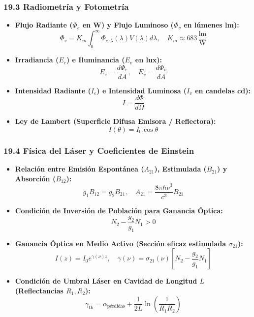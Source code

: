 \documentclass[11pt,a4paper]{article}
\begin{document}
\subsubsection*{19.3 Radiometría y Fotometría}

\begin{itemize}
  \item \textbf{Flujo Radiante ($\Phi_e$ en W) y Flujo Luminoso ($\Phi_v$ en lúmenes lm):}
  \[
    \Phi_v = K_m \int_0^\infty \Phi_{e,\lambda}(\lambda) V(\lambda) d\lambda, \quad K_m \approx 683 \, \frac{\text{lm}}{\text{W}}
  \]
  \item \textbf{Irradiancia ($E_e$) e Iluminancia ($E_v$ en lux):}
  \[
    E_e = \frac{d\Phi_e}{dA}, \quad E_v = \frac{d\Phi_v}{dA}
  \]
  \item \textbf{Intensidad Radiante ($I_e$) e Intensidad Luminosa ($I_v$ en candelas cd):}
  \[
    I = \frac{d\Phi}{d\Omega}
  \]
  \item \textbf{Ley de Lambert (Superficie Difusa Emisora / Reflectora):}
  \[
    I(\theta) = I_0 \cos\theta
  \]
\end{itemize}

\subsubsection*{19.4 Física del Láser y Coeficientes de Einstein}

\begin{itemize}
  \item \textbf{Relación entre Emisión Espontánea ($A_{21}$), Estimulada ($B_{21}$) y Absorción ($B_{12}$):}
  \[
    g_1 B_{12} = g_2 B_{21}, \quad A_{21} = \frac{8\pi h \nu^3}{c^3} B_{21}
  \]
  \item \textbf{Condición de Inversión de Población para Ganancia Óptica:}
  \[
    N_2 - \frac{g_2}{g_1} N_1 > 0
  \]
  \item \textbf{Ganancia Óptica en Medio Activo (Sección eficaz estimulada $\sigma_{21}$):}
  \[
    I(z) = I_0 e^{\gamma(\nu) z}, \quad \gamma(\nu) = \sigma_{21}(\nu)\left[ N_2 - \frac{g_2}{g_1} N_1 \right]
  \]
  \item \textbf{Condición de Umbral Láser en Cavidad de Longitud $L$ (Reflectancias $R_1, R_2$):}
  \[
    \gamma_{\text{th}} = \alpha_{\text{pérdidas}} + \frac{1}{2L}\ln\left( \frac{1}{R_1 R_2} \right)
  \]
\end{itemize}
\end{document}
